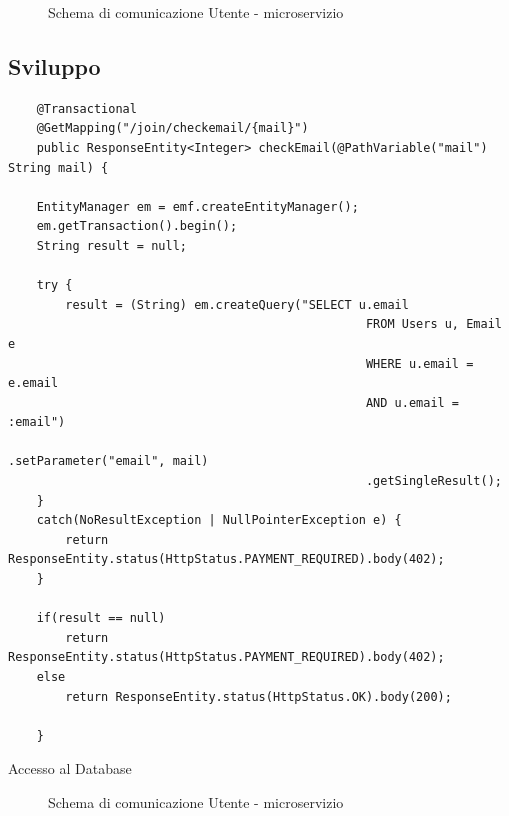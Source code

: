 \begin{figure}[ht]
	\centering
	\caption{Schema di comunicazione Utente - microservizio}
	\label{fig:one}
\end{figure}

\subsection{Sviluppo}\label{sec:sviluppomicroservizio}
\begin{algorithm}
\centering
\begin{verbatim}
	@Transactional
	@GetMapping("/join/checkemail/{mail}")
	public ResponseEntity<Integer> checkEmail(@PathVariable("mail") String mail) {

	EntityManager em = emf.createEntityManager();
	em.getTransaction().begin();
	String result = null;

	try {
		result = (String) em.createQuery("SELECT u.email
                                                  FROM Users u, Email e
                                                  WHERE u.email = e.email 
                                                  AND u.email = :email")
                                                  .setParameter("email", mail)
                                                  .getSingleResult();
	}
	catch(NoResultException | NullPointerException e) {
		return ResponseEntity.status(HttpStatus.PAYMENT_REQUIRED).body(402);
	}

	if(result == null)
		return ResponseEntity.status(HttpStatus.PAYMENT_REQUIRED).body(402);
	else
		return ResponseEntity.status(HttpStatus.OK).body(200);

	}
\end{verbatim}
\caption{Accesso al Database}
\end{algorithm}

\begin{figure}[ht]
	\centering
	\caption{Schema di comunicazione Utente - microservizio}
	\label{fig:one}
\end{figure}

